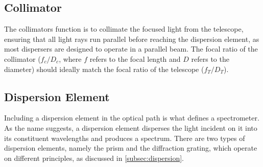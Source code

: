 \subsection{Collimator}

The collimators function is to collimate the focused light from the telescope, ensuring that all light rays run parallel before reaching the dispersion element, as most dispersers are designed to operate in a parallel beam.
The focal ratio of the collimator ($f_{c} / D_{c}$, where $f$ refers to the focal length and $D$ refers to the diameter) should ideally match the focal ratio of the telescope ($f_{T} / D_{T}$).





\subsection{Dispersion Element}

Including a dispersion element in the optical path is what defines a spectrometer.
As the name suggests, a dispersion element disperses the light incident on it into its constituent wavelengths and produces a spectrum.
There are two types of dispersion elements, namely the prism and the diffraction grating, which operate on different principles, as discussed in \autoref{subsec:dispersion}.

